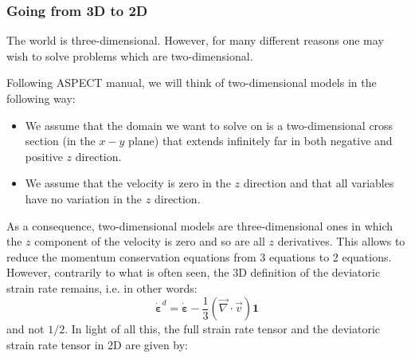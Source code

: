 \subsubsection{Going from 3D to 2D}

The world is three-dimensional. However, for many different reasons one may wish to solve problems
which are two-dimensional. 

Following ASPECT manual, we  will think of two-dimensional models in the following way: 
\begin{itemize}
\item We assume that the domain we want to solve on is a two-dimensional cross section (in the $x-y$ plane) 
that extends infinitely far in both negative and positive $z$ direction.  
\item We assume that the velocity is zero in the $z$ direction and that all variables 
have no variation in the $z$ direction. 
\end{itemize}

As a consequence, two-dimensional models are three-dimensional ones in which the $z$ 
component of the velocity is zero and so are all $z$ derivatives.
This allows to reduce the momentum conservation equations from 3 equations to 2 equations. 
However, contrarily to what is often seen, the 3D definition of the deviatoric strain rate 
remains, i.e. in other words:
\begin{equation}
\dot{\bm \varepsilon}^d = \dot{\bm \varepsilon} -\frac{1}{3}(\vec\nabla\cdot\vec v) {\bm 1} 
\end{equation}
and not $1/2$.
In light of all this, the full strain rate tensor and the 
deviatoric strain rate tensor in 2D are given by:

